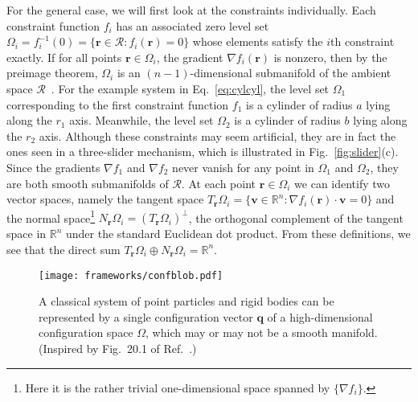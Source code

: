 For the general case, we will first look at the constraints individually.
Each constraint function $f_i$ has an associated zero level set $\Omega_i = f_i^{-1}(0) = \{\bm{r} \in \mathscr{R}: f_i(\bm{r}) = 0\}$ whose elements satisfy the $i$th constraint exactly.
If for all points $\bm{r} \in \Omega_{i}$, the gradient $\nabla f_i(\bm{r})$ is nonzero, then by the preimage theorem, $\Omega_i$ is an $(n-1)$-dimensional submanifold of the ambient space $\mathscr{R}$~\cite{guillemin1974,lee2013}.
For the example system in Eq.~\eqref{eq:cylcyl}, the level set $\Omega_1$ corresponding to the first constraint function $f_1$ is a cylinder of radius $a$ lying along the $r_{1}$ axis.
Meanwhile, the level set $\Omega_2$ is a cylinder of radius $b$ lying along the $r_{2}$ axis.
Although these constraints may seem artificial, they are in fact the ones seen in a three-slider mechanism, which is illustrated in Fig.~\ref{fig:slider}(c).
Since the gradients $\nabla f_1$ and $\nabla f_2$ never vanish for any point in $\Omega_1$ and $\Omega_2$, they are both smooth submanifolds of $\mathscr{R}$.
At each point $\bm{r} \in \Omega_i$ we can identify two vector spaces, namely the tangent space $T_{\bm{r}}\Omega_i = \{\bm{v} \in \mathbb{R}^n: \nabla f_i(\bm{r})\cdot \bm{v} = 0\}$ and the normal space\footnote{Here it is the rather trivial one-dimensional space spanned by $\{\nabla f_i\}$.} $N_{\bm{r}}\Omega_i = (T_{\bm{r}}\Omega_i)^\perp$, the orthogonal complement of the tangent space in $\mathbb{R}^n$ under the standard Euclidean dot product.
From these definitions, we see that the direct sum $T_{\bm{r}}\Omega_i\oplus N_{\bm{r}}\Omega_i = \mathbb{R}^n$.
%
\begin{figure}
  \begin{center}
    \texttt{[image: frameworks/confblob.pdf]}
  \end{center}
  \caption{A classical system of point particles and rigid bodies can be represented by a single configuration vector $\bm{q}$ of a high-dimensional configuration space $\Omega$, which may or may not be a smooth manifold. (Inspired by Fig.~20.1 of Ref.~\cite{penrose2004}.)}
  \label{fig:confblob}
\end{figure}

